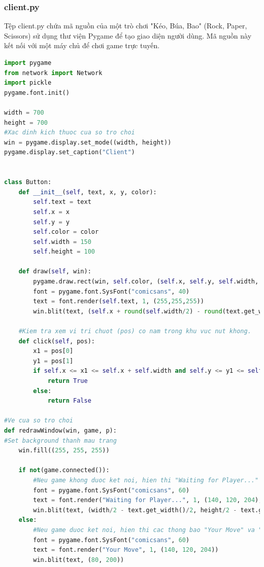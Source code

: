 \documentclass[a4paper]{article}
\begin{document}
\subsubsection{client.py}
Tệp client.py chứa mã nguồn của một trò chơi "Kéo, Búa, Bao" (Rock, Paper, Scissors) sử dụng thư viện Pygame để tạo giao diện người dùng. Mã nguồn này kết nối với một máy chủ để chơi game trực tuyến.
\begin{mdframed}[hidealllines=true,backgroundcolor=magenta!10]
	\begin{lstlisting}[language=Python]
import pygame
from network import Network
import pickle
pygame.font.init()

width = 700
height = 700
#Xac dinh kich thuoc cua so tro choi
win = pygame.display.set_mode((width, height))
pygame.display.set_caption("Client")


class Button:
    def __init__(self, text, x, y, color):
        self.text = text
        self.x = x
        self.y = y
        self.color = color
        self.width = 150
        self.height = 100

    def draw(self, win):
        pygame.draw.rect(win, self.color, (self.x, self.y, self.width, self.height))
        font = pygame.font.SysFont("comicsans", 40)
        text = font.render(self.text, 1, (255,255,255))
        win.blit(text, (self.x + round(self.width/2) - round(text.get_width()/2), self.y + round(self.height/2) - round(text.get_height()/2)))
        
    #Kiem tra xem vi tri chuot (pos) co nam trong khu vuc nut khong.
    def click(self, pos): 
        x1 = pos[0]
        y1 = pos[1]
        if self.x <= x1 <= self.x + self.width and self.y <= y1 <= self.y + self.height:
            return True
        else:
            return False

#Ve cua so tro choi
def redrawWindow(win, game, p):
#Set background thanh mau trang
    win.fill((255, 255, 255))

    if not(game.connected()):
        #Neu game khong duoc ket noi, hien thi "Waiting for Player..."
        font = pygame.font.SysFont("comicsans", 60)
        text = font.render("Waiting for Player...", 1, (140, 120, 204), True)
        win.blit(text, (width/2 - text.get_width()/2, height/2 - text.get_height()/2))
    else:
        #Neu game duoc ket noi, hien thi cac thong bao "Your Move" va "Opponents"
        font = pygame.font.SysFont("comicsans", 60)
        text = font.render("Your Move", 1, (140, 120, 204))
        win.blit(text, (80, 200))


\end{lstlisting}
\end{mdframed}
\end{document}
